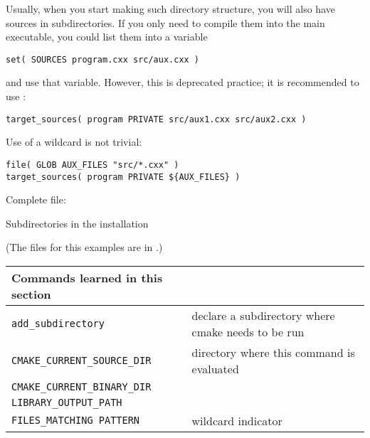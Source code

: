 \begin{floatingfigure}[r]{2.5in}\vskip3in\end{floatingfigure}
%
Usually, when you start making such directory structure,
you will also have sources in subdirectories.
If you only need to compile them into the main executable,
you could list them into a variable
\begin{lstlisting}
set( SOURCES program.cxx src/aux.cxx )
\end{lstlisting}
and use that variable.
However, this is deprecated practice;
it is recommended to use :
\begin{lstlisting}
target_sources( program PRIVATE src/aux1.cxx src/aux2.cxx )
\end{lstlisting}
Use of a wildcard is not trivial:
\begin{lstlisting}
file( GLOB AUX_FILES "src/*.cxx" )
target_sources( program PRIVATE ${AUX_FILES} )
\end{lstlisting}

Complete  file:
%


\newpage
{} {Subdirectories in the installation}
\label{sec:cmake-install-dirs}
\label{sec:cmake-rpath}

(The files for this examples are in .)

\begin{tabular}{lp{3in}}
  \toprule
  Commands learned in this section\\
  \midrule
  \lstinline+add_subdirectory+&declare a subdirectory where cmake needs to be run\\
  \lstinline+CMAKE_CURRENT_SOURCE_DIR+&directory where this command is evaluated\\
  \lstinline+CMAKE_CURRENT_BINARY_DIR+&\\
  \lstinline+LIBRARY_OUTPUT_PATH+&\\
  \lstinline+FILES_MATCHING PATTERN+&wildcard indicator\\
  \bottomrule
\end{tabular}

